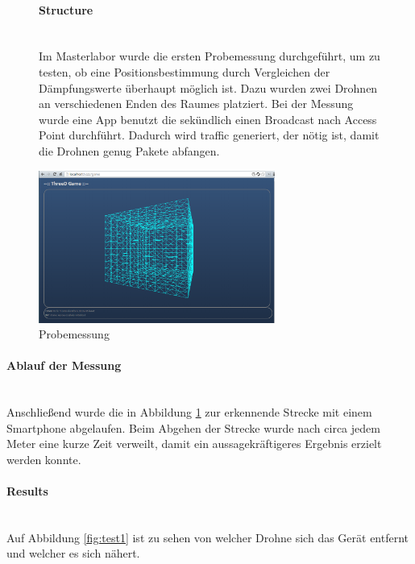 \documentclass[a4paper]{spie}  %
\begin{document}
\begin{figure}[H]
\begin{minipage}[t]{0.4\textwidth}
\vspace{0pt}
\paragraph{Structure}\mbox{}\\
Im Masterlabor wurde die ersten Probemessung durchgeführt, um zu testen, ob eine Positionsbestimmung durch Vergleichen der Dämpfungswerte überhaupt möglich ist. Dazu wurden zwei Drohnen an verschiedenen Enden des Raumes platziert. Bei der Messung wurde eine App benutzt die sekündlich einen Broadcast nach Access Point durchführt. Dadurch wird traffic generiert, der nötig ist, damit die Drohnen genug Pakete abfangen.
\end{minipage}
\hfill
\begin{minipage}[t]{0.5\textwidth}
\vspace{0pt}
\centering
		\includegraphics[height=5cm]{./images/FrontendInit.png}
		\caption{Probemessung}
		\label{fig:probeMessung}
\end{minipage}
\end{figure}

\paragraph{Ablauf der Messung}\mbox{}\\
Anschließend wurde die in Abbildung \ref{fig:probeMessung} zur erkennende Strecke mit einem Smartphone abgelaufen. Beim Abgehen der Strecke wurde nach circa jedem Meter eine kurze Zeit verweilt, damit ein aussagekräftigeres Ergebnis erzielt werden konnte.

\paragraph{Results}\mbox{}\\
Auf Abbildung \ref{fig:test1} ist zu sehen von welcher Drohne sich das Gerät entfernt und welcher es sich nähert.\\
\end{document}

